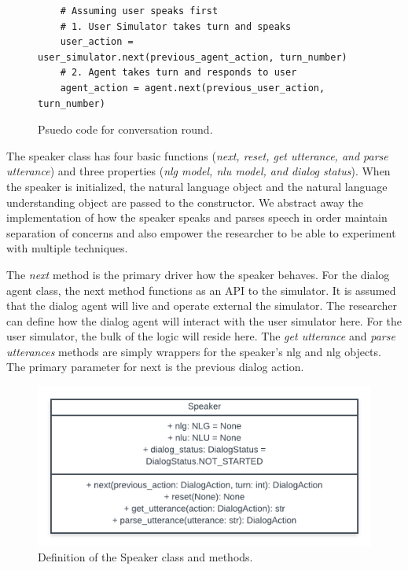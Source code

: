 \begin{figure}[h!]
	\caption{Psuedo code for conversation round.}
	\label{fig:conv_round}
	\begin{lstlisting}
	# Assuming user speaks first 
	# 1. User Simulator takes turn and speaks
	user_action = user_simulator.next(previous_agent_action, turn_number)
	# 2. Agent takes turn and responds to user 
	agent_action = agent.next(previous_user_action, turn_number)
	\end{lstlisting}
\end{figure}

The speaker class has four basic functions (\textit{next, reset, get utterance, and parse utterance}) and three properties (\textit{nlg model, nlu model, and dialog status}). When the speaker is initialized, the natural language object and the natural language understanding object are passed to the constructor. We abstract away the implementation of how the speaker speaks and parses speech in order maintain separation of concerns and also empower the researcher to be able to experiment with multiple techniques. 

The \textit{next} method is the primary driver how the speaker behaves. For the dialog agent class, the next method functions as an API to the simulator. It is assumed that the dialog agent will live and operate external the simulator. The researcher can define how the dialog agent will interact with the user simulator here. For the user simulator, the bulk of the logic will reside here. The \textit{get utterance} and \textit{parse utterances} methods are simply wrappers for the speaker's nlg and nlg objects. The primary parameter for next is the previous dialog action. 

\begin{figure}[h!]
	\includegraphics[width=\linewidth]{diagrams/speaker_class.png}
	\caption{ Definition of the Speaker class and methods.}
	\label{fig:speaker_class}
\end{figure}



